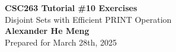 \begin{titlepage}
    \null %
    \vfill
    \begin{center}
        {\fontsize{35}{48}\selectfont \bfseries CSC263 Tutorial \#10 Exercises}
        \vspace{20pt} \\
        {\LARGE Disjoint Sets with Efficient PRINT Operation} \\
        \vspace{20pt}
        \textbf{Alexander He Meng}
        \vspace{8pt}
        \\ Prepared for March 28th, 2025
    \end{center}
    \vfill
\end{titlepage}
